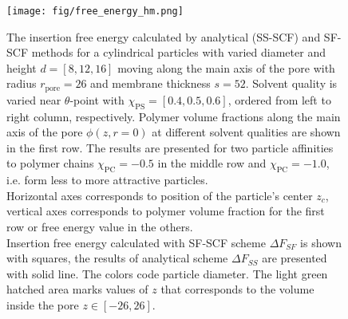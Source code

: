 \documentclass[12pt, a4paper]{article}
\begin{document}

\begin{figure}
        \centering
        \texttt{[image: fig/free\_energy\_hm.png]}
        \caption{ 
        The insertion free energy calculated by analytical (SS-SCF) and SF-SCF methods for a cylindrical particles with varied diameter and height $d=[8, 12, 16]$ moving along the main axis of the pore with radius $r_{\textrm{pore}} = 26$ and membrane thickness $s=52$.
        Solvent quality is varied near $\theta$-point with $\chi_{\textrm{PS}} = [0.4, 0.5, 0.6]$, ordered from left to right column, respectively.
        Polymer volume fractions along the main axis of the pore $\phi(z,r=0)$ at different solvent qualities are shown in the first row.
        The results are presented for two particle affinities to polymer chains $\chi_{\textrm{PC}} = -0.5$ in the middle row and $\chi_{\textrm{PC}} = -1.0$, i.e. form less to more attractive particles.
        \\
        Horizontal axes corresponds to position of the particle's center $z_c$, vertical axes corresponds to polymer volume fraction for the first row or free energy value in the others.
        \\
        Insertion free energy calculated with SF-SCF scheme $\Delta F_{SF}$ is shown with squares, the results of analytical scheme $\Delta F_{SS}$ are presented with solid line. 
        The colors code particle diameter.
        The light green hatched area marks values of $z$ that corresponds to the volume inside the pore $z\in [-26, 26]$.
        \label{fig:fe_scf_grid}
        }
\end{figure}
    
\end{document}
